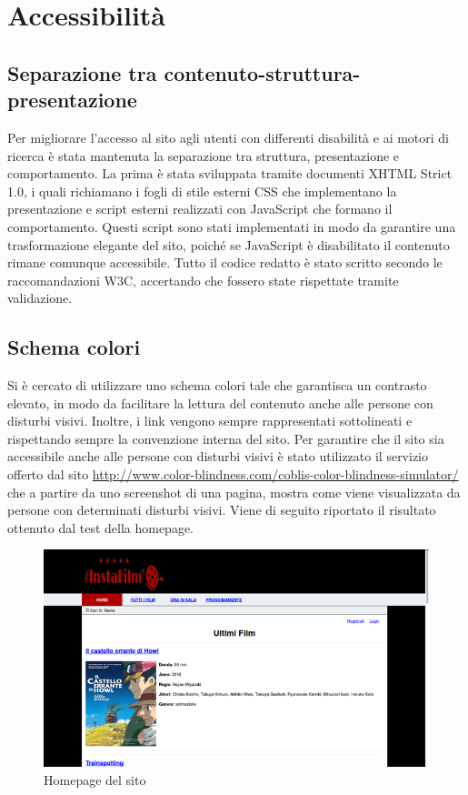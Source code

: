 \documentclass[../Relazione.tex]{subfiles}
\begin{document}
\section{Accessibilità}

\subsection{Separazione tra contenuto-struttura-presentazione}

Per migliorare l'accesso al sito agli utenti con differenti disabilità e ai motori di ricerca è stata mantenuta la separazione tra struttura, presentazione e comportamento. La prima è stata sviluppata tramite documenti XHTML Strict 1.0, i quali richiamano i fogli di stile esterni CSS che implementano la presentazione e script esterni realizzati con JavaScript che formano il comportamento. Questi script sono stati implementati in modo da garantire una trasformazione elegante del sito, poiché se JavaScript è disabilitato il contenuto rimane comunque accessibile. Tutto il codice redatto è stato scritto secondo le raccomandazioni W3C, accertando che fossero state rispettate tramite validazione.

\subsection{Schema colori}

Si è cercato di utilizzare uno schema colori tale che garantisca un contrasto elevato, in modo da facilitare la lettura del contenuto anche alle persone con disturbi visivi. Inoltre, i link vengono sempre rappresentati sottolineati e rispettando sempre la convenzione interna del sito. Per garantire che il sito sia accessibile anche alle persone con disturbi visivi è stato utilizzato il servizio offerto dal sito \url{http://www.color-blindness.com/coblis-color-blindness-simulator/} che a partire da uno screenshot di una pagina, mostra come viene visualizzata da persone con determinati disturbi visivi. Viene di seguito riportato il risultato ottenuto dal test della homepage.
\newpage

\begin{figure}[!h]
		\centering
		\includegraphics[scale=0.4]{immagini/prova.png}
			\caption{Homepage del sito}
		\label{fig:Homepage del sito}
\end{figure}
\end{document}
